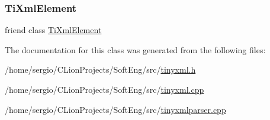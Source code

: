 \subsubsection{\texorpdfstring{Ti\+Xml\+Element}{TiXmlElement}}
{\footnotesize\ttfamily friend class \hyperlink{class_ti_xml_element}{Ti\+Xml\+Element}\hspace{0.3cm}{\ttfamily [friend]}}



The documentation for this class was generated from the following files\+:\begin{DoxyCompactItemize}
\item 
/home/sergio/\+C\+Lion\+Projects/\+Soft\+Eng/src/\hyperlink{tinyxml_8h}{tinyxml.\+h}\item 
/home/sergio/\+C\+Lion\+Projects/\+Soft\+Eng/src/\hyperlink{tinyxml_8cpp}{tinyxml.\+cpp}\item 
/home/sergio/\+C\+Lion\+Projects/\+Soft\+Eng/src/\hyperlink{tinyxmlparser_8cpp}{tinyxmlparser.\+cpp}\end{DoxyCompactItemize}
